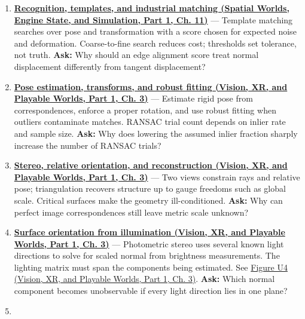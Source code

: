 \begin{enumerate}
\item
  \textbf{\href{../05-Spatial-Worlds-Engine-State-and-Simulation-P01/main.pdf\#nameddest=04-visual-computing-ii-ch030-recognition-templates-and-industrial-matching}{Recognition, templates, and industrial matching (Spatial Worlds, Engine State, and Simulation, Part 1, Ch. 11)}} --- Template matching searches over pose and transformation with a score chosen for expected noise and deformation. Coarse-to-fine search reduces cost; thresholds set tolerance, not truth. \textbf{Ask:} Why should an edge alignment score treat normal displacement differently from tangent displacement?
\item
  \textbf{\href{../07-Vision-XR-and-Playable-Worlds-P01/main.pdf\#nameddest=04-visual-computing-ii-ch032-pose-estimation-transforms-and-robust-fitting}{Pose estimation, transforms, and robust fitting (Vision, XR, and Playable Worlds, Part 1, Ch. 3)}} --- Estimate rigid pose from correspondences, enforce a proper rotation, and use robust fitting when outliers contaminate matches. RANSAC trial count depends on inlier rate and sample size. \textbf{Ask:} Why does lowering the assumed inlier fraction sharply increase the number of RANSAC trials?
\item
  \textbf{\href{../07-Vision-XR-and-Playable-Worlds-P01/main.pdf\#nameddest=04-visual-computing-ii-ch032-stereo-relative-orientation-and-reconstruction}{Stereo, relative orientation, and reconstruction (Vision, XR, and Playable Worlds, Part 1, Ch. 3)}} --- Two views constrain rays and relative pose; triangulation recovers structure up to gauge freedoms such as global scale. Critical surfaces make the geometry ill-conditioned. \textbf{Ask:} Why can perfect image correspondences still leave metric scale unknown?
\item
  \textbf{\href{../07-Vision-XR-and-Playable-Worlds-P01/main.pdf\#nameddest=04-visual-computing-ii-ch032-surface-orientation-from-illumination}{Surface orientation from illumination (Vision, XR, and Playable Worlds, Part 1, Ch. 3)}} --- Photometric stereo uses several known light directions to solve for scaled normal from brightness measurements. The lighting matrix must span the components being estimated. See \href{../07-Vision-XR-and-Playable-Worlds-P01/main.pdf\#nameddest=04-visual-computing-ii-ch032-figure-u4---lighting-rank-determines-which-normal-components-can-be-measured}{Figure U4 (Vision, XR, and Playable Worlds, Part 1, Ch. 3)}. \textbf{Ask:} Which normal component becomes unobservable if every light direction lies in one plane?
\item

\end{enumerate}

